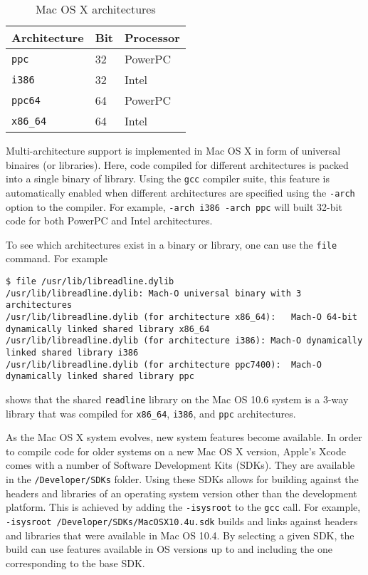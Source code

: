 \documentclass{article}[12pt,a4]
\begin{document}
\begin{table}[!h]
  \center
  \begin{tabular}{lll}
  \hline
  Architecture & Bit & Processor \\
  \hline
  {\tt ppc} & 32 & PowerPC \\
  {\tt i386} & 32 & Intel \\
  {\tt ppc64} & 64 & PowerPC \\
  {\tt x86\_64} & 64 & Intel \\
  \hline
  \end{tabular}
  \caption{Mac OS X architectures}
  \label{table:arch}
\end{table}

Multi-architecture support is implemented in Mac OS X in form of universal binaires (or libraries).
Here, code compiled for different architectures is packed into a single binary of library.
Using the {\tt gcc} compiler suite, this feature is automatically enabled when different
architectures are specified using the {\tt -arch} option to the compiler.
For example, {\tt -arch i386 -arch ppc} will built 32-bit code for both PowerPC and Intel
architectures.

To see which architectures exist in a binary or library, one can use the {\tt file} command.
For example
{\scriptsize
\begin{verbatim} 
$ file /usr/lib/libreadline.dylib 
/usr/lib/libreadline.dylib: Mach-O universal binary with 3 architectures
/usr/lib/libreadline.dylib (for architecture x86_64):	Mach-O 64-bit dynamically linked shared library x86_64
/usr/lib/libreadline.dylib (for architecture i386):	Mach-O dynamically linked shared library i386
/usr/lib/libreadline.dylib (for architecture ppc7400):	Mach-O dynamically linked shared library ppc
\end{verbatim}}
shows that the shared {\tt readline} library on the Mac OS 10.6 system is a 3-way library that
was compiled for {\tt x86\_64}, {\tt i386}, and {\tt ppc} architectures.

As the Mac OS X system evolves, new system features become available.
In order to compile code for older systems on a new Mac OS X version, Apple's Xcode comes
with a number of Software Development Kits (SDKs).
They are available in the {\tt /Developer/SDKs} folder.
Using these SDKs allows for building against the headers and libraries of an operating
system version other than the development platform.
This is achieved by adding the {\tt -isysroot} to the {\tt gcc} call.
For example, {\tt -isysroot /Developer/SDKs/MacOSX10.4u.sdk} builds and links against
headers and libraries that were available in Mac OS 10.4.
By selecting a given SDK, the build can use features available in OS versions up to and including 
the one corresponding to the base SDK.
\end{document}
